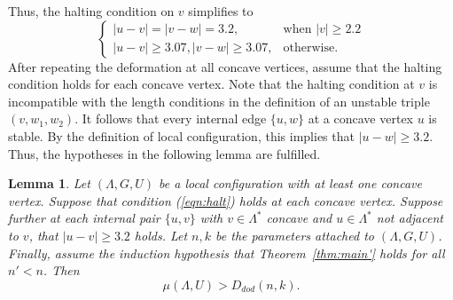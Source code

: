 \documentclass{article} %
\newtheorem{lemma}{Lemma}[subsection]
\begin{document}
Thus, the halting condition on $v$ simplifies to 
\begin{equation}\label{eqn:halt}
\begin{cases}
|u-v|=|v-w|=3.2,& \text{when } |v|\ge 2.2\\
|u-v|\ge 3.07, |v-w|\ge 3.07,& \text{otherwise.}
\end{cases}
\end{equation}
After repeating the deformation at all concave vertices, assume that the halting condition
holds for each concave vertex.  Note that the halting
condition at $v$ is incompatible with the length conditions in
the definition of an unstable triple $(v,w_1,w_2)$.  It
follows that every internal edge $\{u,w\}$
at a concave vertex $u$ is stable.  By the definition of local configuration, this
implies that $|u-w|\ge 3.2$.  Thus, the hypotheses in the following lemma are fulfilled.

\begin{lemma}\label{lemma:concave}  
Let $(\Lambda,G,U)$ be a local configuration with at least one
concave vertex.  Suppose that 
condition (\ref{eqn:halt}) holds at each concave vertex.  Suppose further at each internal
pair $\{u,v\}$ with $v\in\Lambda^*$ concave and $u\in\Lambda^*$ not adjacent to $v$,
that $|u-v|\ge 3.2$ holds.   Let $n,k$ be the parameters attached
to $(\Lambda,G,U)$.  Finally, assume the induction hypothesis that Theorem~\ref{thm:main'}
holds for all $n'<n$. Then
   $$\mu(\Lambda,U) > D_{dod}(n,k).$$
\end{lemma}
\end{document}
